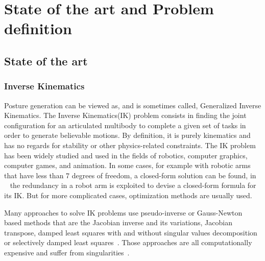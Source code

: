 
\chapter{State of the art and Problem definition}
\label{cha:state_of_the_art_and_problem_definition}

\graphicspath{{Chapter1-State-of-the-art/Figs/}}

\section{State of the art}
\label{sec:state_of_the_art}

\subsection{Inverse Kinematics}
\label{sub:inverse_kinematics}

Posture generation can be viewed as, and is sometimes called, Generalized Inverse Kinematics.
The Inverse Kinematics(IK) problem consists in finding the joint configuration for an articulated multibody to complete a given set of tasks in order to generate believable motions.
By definition, it is purely kinematics and has no regards for stability or other physics-related constraints.
The IK problem has been widely studied and used in the fields of robotics, computer graphics, computer games, and animation.
In some cases, for example with robotic arms that have less than 7 degrees of freedom, a closed-form solution can be found, in ~\cite{asfour2003human} the redundancy in a robot arm is exploited to devise a closed-form formula for its IK.
But for more complicated cases, optimization methods are usually used.



Many approaches to solve IK problems use pseudo-inverse or Gauss-Newton based methods that are the Jacobian inverse and its variations, Jacobian transpose, damped least squares with and without singular values decomposition or selectively damped least squares~\cite{balestrino1984robust, tolani2000real, baillieul1985kinematic, wampler1986manipulator, nakamura1986inverse, buss2005selectively}.
Those approaches are all computationally expensive and suffer from singularities~\cite{aristidou2009inverse}.

